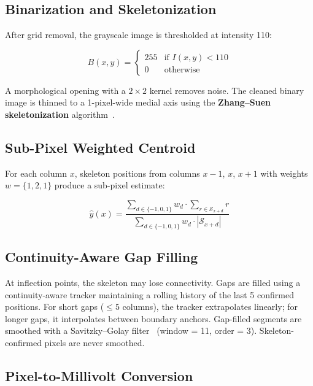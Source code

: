 \documentclass[conference]{IEEEtran}
\begin{document}
\subsection{Binarization and Skeletonization}

After grid removal, the grayscale image is thresholded at intensity 110:

\begin{equation}
  B(x,y) = \begin{cases} 255 & \text{if } I(x,y) < 110 \\ 0 & \text{otherwise} \end{cases}
\end{equation}

A morphological opening with a $2 \times 2$ kernel removes noise. The
cleaned binary image is thinned to a 1-pixel-wide medial axis using the
\textbf{Zhang--Suen skeletonization} algorithm~\cite{zhang1984}.

\subsection{Sub-Pixel Weighted Centroid}

For each column $x$, skeleton positions from columns $x{-}1$, $x$, $x{+}1$
with weights $w = \{1, 2, 1\}$ produce a sub-pixel estimate:

\begin{equation}
  \hat{y}(x) = \frac{\sum_{d \in \{-1,0,1\}} w_d \cdot \sum_{r \in \mathcal{S}_{x+d}} r}
                     {\sum_{d \in \{-1,0,1\}} w_d \cdot |\mathcal{S}_{x+d}|}
\end{equation}

\subsection{Continuity-Aware Gap Filling}

At inflection points, the skeleton may lose connectivity. Gaps are filled
using a continuity-aware tracker maintaining a rolling history of the last 5
confirmed positions. For short gaps ($\leq 5$ columns), the tracker
extrapolates linearly; for longer gaps, it interpolates between boundary
anchors. Gap-filled segments are smoothed with a Savitzky--Golay
filter~\cite{savitzky1964} (window = 11, order = 3). Skeleton-confirmed
pixels are never smoothed.

\subsection{Pixel-to-Millivolt Conversion}
\end{document}
